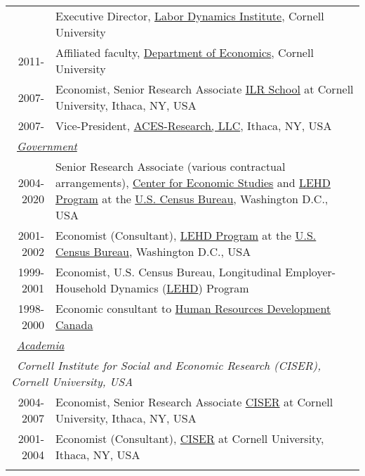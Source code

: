 \documentclass[10pt,letterpaper]{report}
\begin{document}
\begin{longtable}{rp{5in}}
\begin{tabular}{p{0.75in}p{4in}}
2011-    &Executive Director,  \href{http://www.ilr.cornell.edu/ldi}{Labor Dynamics Institute}, 
Cornell University\\ %
2011-    &Affiliated faculty, \href{http://economics.cornell.edu}{Department of Economics}, 
Cornell University\\ %
2007-    & Economist, Senior Research Associate 
\href{http://www.ilr.cornell.edu}{ILR School} at Cornell University, Ithaca,
NY, USA 
\\%
2007-    & Vice-President,
\href{https://www.aces-research.com}{ACES-Research, LLC}, Ithaca,
NY, USA\\[.3cm]
\multicolumn{2}{l}{\ \it \underline{Government}}\\
2004-2020  &Senior Research Associate (various contractual arrangements),
\href{https://www.ces.census.gov}{Center for Economic Studies} and 
\href{https://lehd.ces.census.gov}{LEHD Program} at the
\href{https://www.census.gov}{U.S. Census Bureau}, Washington D.C., USA 
\\ %
2001-2002    &Economist (Consultant), \href{https://lehd.ces.census.gov}{LEHD Program} at the
\href{https://www.census.gov}{U.S. Census Bureau}, Washington D.C., USA 
\\%
1999-2001    &Economist, U.S. Census Bureau, Longitudinal
Employer-Household Dynamics (\href{https://lehd.ces.census.gov}{LEHD}) Program 
\\%
1998-2000    &Economic consultant to
\href{http://www.hrdc-drhc.gc.ca/}{Human Resources Development Canada}
\\[.3cm]

\multicolumn{2}{l}{\ \it \underline{Academia}}\\
%
%
\multicolumn{2}{l}{\ \it Cornell Institute for Social and Economic
  Research (CISER), Cornell University, USA}\\
2004-2007    & Economist, Senior Research Associate 
\href{http://www.ciser.cornell.edu}{CISER} at Cornell University, Ithaca,
NY, USA 
\\%
2001-2004    & Economist (Consultant), 
\href{http://www.ciser.cornell.edu}{CISER} at Cornell University, Ithaca,
NY, USA 
\\[.3cm]



\end{tabular}
\end{longtable}
\end{document}
